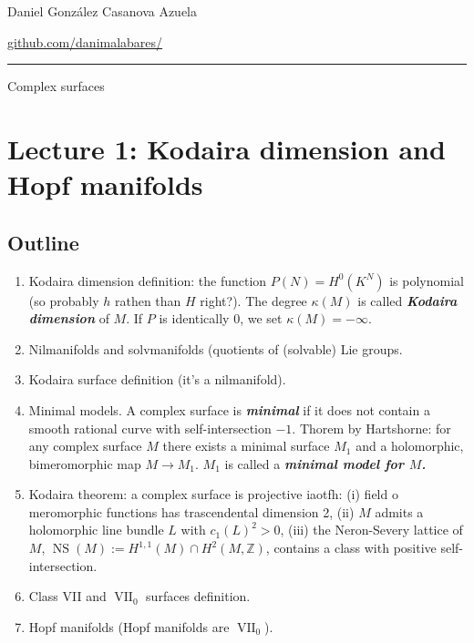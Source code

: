 
%




\begin{minipage}{\textwidth}
	\begin{minipage}{1\textwidth}
		 \hfill Daniel González Casanova Azuela
		
		{\small \hfill\href{https://github.com/danimalabares/}{github.com/danimalabares/}}
	\end{minipage}
\end{minipage}\vspace{.2cm}\hrule

\vspace{10pt}
{\huge Complex surfaces}

\tableofcontents

\section{Lecture 1: Kodaira dimension and Hopf manifolds}

\subsection{Outline}
\begin{enumerate}
\item Kodaira dimension definition: the function \(P(N)=H^{0}(K^N)\) is polynomial (so probably \(h\) rathen than \(H\) right?). The degree  \(\kappa(M)\) is called \textit{\textbf{Kodaira dimension}} of \(M\). If \(P\) is identically 0, we set \(\kappa(M)=-\infty\).
\item Nilmanifolds and solvmanifolds (quotients of (solvable) Lie groups.
\item Kodaira surface definition (it's a nilmanifold).
\item Minimal models. A complex surface is \textit{\textbf{minimal}} if it does not contain a smooth rational curve with self-intersection \(-1\). Thorem by Hartshorne: for any complex surface \(M\) there exists a minimal surface \(M_1\) and a holomorphic, bimeromorphic map \(M \to M_1\). \(M_1\) is called a \textit{\textbf{minimal model for \(M\).}}
\item Kodaira theorem: a complex surface is projective iaotfh: (i) field o meromorphic functions has trascendental dimension 2, (ii)  \(M\) admits a holomorphic line bundle \(L\) with \(c_1(L)^2>0\), (iii) the Neron-Severy lattice of \(M\), \(\operatorname{NS}(M):=H^{1,1}(M)\cap H^{2}(M,\mathbb{Z})\), contains a class with positive self-intersection. 
\item Class VII and \(\operatorname{V I I}_0\) surfaces definition.
\item Hopf manifolds (Hopf manifolds are \(\operatorname{  V I I}_0\)).
\end{enumerate}

